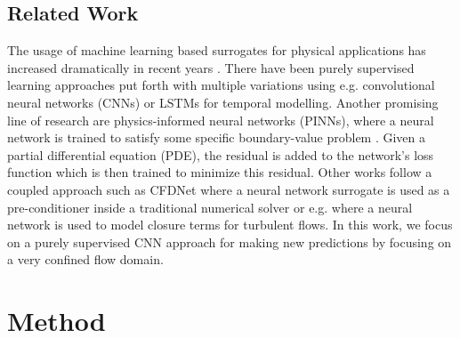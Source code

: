 \documentclass{article} %
\begin{document}
\subsection*{Related Work}
The usage of machine learning based surrogates for physical applications has increased dramatically in recent years \citep{Vinuesa2021,Chen2021,Zhu2019}.
There have been purely supervised learning approaches put forth \citep{nn_pde_data} with multiple variations using e.g. convolutional neural networks (CNNs) \citep{nn_pde_cnn, Thuerey2019} or LSTMs \citep{dl_lstm} for temporal modelling.
Another promising line of research are physics-informed neural networks (PINNs), where a neural network is trained to satisfy some specific boundary-value problem \citep{pinn,pinn_subsurface,pinn_hfm,pinn_pathologies,Gao2021}. 
Given a partial differential equation (PDE), the residual is added to the network's loss function which is then trained to minimize this residual.
Other works follow a coupled approach such as CFDNet \citep{cfdnet} where a neural network surrogate is used as a pre-conditioner inside a traditional numerical solver or e.g. \citet{BECK2019108910} where a neural network is used to model closure terms for turbulent flows.
In this work, we focus on a purely supervised CNN approach for making new predictions by focusing on a very confined flow domain.


\section{Method}
\label{sec:method}


\end{document}
